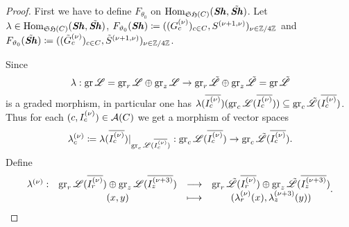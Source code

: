 \begin{proof}
    First we have to define $F_{\theta_0}$ on $\operatorname{Hom}_{\mathfrak{SH}(C)}(\bm{\mathit{Sh}}, \tilde{\bm{\mathit{Sh}}})$. Let $\lambda \in \operatorname{Hom}_{\mathfrak{SH}(C)}(\bm{\mathit{Sh}}, \tilde{\bm{\mathit{Sh}}})$, $F_{\vartheta_0}(\bm{\mathit{Sh}}) \coloneqq ((G_c^{(\nu)})_{c \in C}, S^{(\nu+1,\nu)})_{\nu \in \mathbb{Z}/4\mathbb{Z}}$ and $F_{\vartheta_0}(\tilde{\bm{\mathit{Sh}}}) \coloneqq ((\tilde{G}_c^{(\nu)})_{c \in C}, \tilde{S}^{(\nu+1,\nu)})_{\nu \in \mathbb{Z}/4\mathbb{Z}}$. 
    
    Since
    \[
    \lambda: \operatorname{gr}\mathscr{L} = \operatorname{gr}_r\mathscr{L} \oplus \operatorname{gr}_z\mathscr{L} \to \operatorname{gr}_r\tilde{\mathscr{L}} \oplus \operatorname{gr}_z\tilde{\mathscr{L}}=\operatorname{gr}\tilde{\mathscr{L}}
    \] is a graded morphism, in particular one has $\lambda(\overline{I_c^{(\nu)}})(\operatorname{gr}_c\mathscr{L}(\overline{I_c^{(\nu)}})) \subseteq \operatorname{gr}_c\tilde{\mathscr{L}}(\overline{I_c^{(\nu)}})$. Thus for each $(c,I_c^{(\nu)}) \in \mathcal{A}(C)$ we get a morphism of vector spaces 
    \[
    \lambda_c^{(\nu)}\coloneqq \lambda(\overline{I_c^{(\nu)}})\vert_{\operatorname{gr}_c\mathscr{L}(\overline{I_c^{(\nu)}})}:\operatorname{gr}_c\mathscr{L}(\overline{I_c^{(\nu)}}) \to \operatorname{gr}_c\tilde{\mathscr{L}}(\overline{I_c^{(\nu)}}).
    \]
    Define
    \[
    \begin{matrix}
        \lambda^{(\nu)}: & \operatorname{gr}_r\mathscr{L}(\overline{I_r^{(\nu)}}) \oplus \operatorname{gr}_z\mathscr{L}(\overline{I_z^{(\nu+3)}}) & \longrightarrow & \operatorname{gr}_r\tilde{\mathscr{L}}(\overline{I_r^{(\nu)}}) \oplus \operatorname{gr}_z\tilde{\mathscr{L}}(\overline{I_z^{(\nu+3)}}) \\
        &(x, y) &\longmapsto  &(\lambda_r^{(\nu)}(x), \lambda_z^{(\nu+3)}(y))
    \end{matrix}.
    \]
    

\end{proof}
